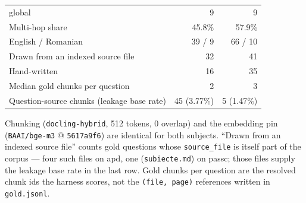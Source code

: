 \begin{table}[htbp]
\begin{tabular}{lrr}
    \quad global                          &       9 &       9 \\
    Multi-hop share                       & 45.8\%  & 57.9\%  \\
    English / Romanian                    & 39 / 9  & 66 / 10 \\
    Drawn from an indexed source file     &      32 &      41 \\
    Hand-written                          &      16 &      35 \\
    Median gold chunks per question       &       2 &       3 \\
    \midrule
    Question-source chunks (leakage base rate) & 45 (3.77\%) & 5 (1.47\%) \\
    \bottomrule
  \end{tabular}

  \vspace{0.5em}
  \footnotesize
  Chunking (\texttt{docling-hybrid}, 512 tokens, 0 overlap) and the embedding pin
  (\texttt{BAAI/bge-m3} @ \texttt{5617a9f6}) are identical for both subjects. ``Drawn from an
  indexed source file'' counts gold questions whose \texttt{source\_file} is itself part of the
  corpus --- four such files on apd, one (\texttt{subiecte.md}) on passc; those files supply the
  leakage base rate in the last row. Gold chunks per question are the resolved chunk ids the
  harness scores, not the \texttt{(file, page)} references written in \texttt{gold.jsonl}.
\end{table}
